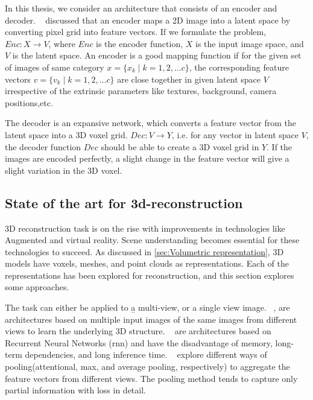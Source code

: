 In this thesis, we consider an architecture that consists of an encoder and decoder.
~\cite{Han2021ImageBased3O} discussed that an encoder maps a 2D image into a latent space by converting pixel grid into feature vectors.
If we formulate the problem, $Enc: X \to V$, where $Enc$ is the encoder function, $X$ is the input image space, and $V$ is the latent space.
An encoder is a good mapping function if for the given set of images of same category $x = \{x_k \mid k = 1,2,\dots c\}$, the corresponding feature vectors $v = \{v_k \mid k = 1,2,\dots c\}$ are close together in given latent space $V$
irrespective of the extrinsic parameters like textures, background, camera positions,etc.

The decoder is an expansive network, which converts a feature vector from the latent space into a 3D voxel grid.
$Dec: V \to Y$, i.e. for any vector in latent space $V$, the decoder function \textbf{$Dec$} should be able to create a 3D voxel grid in $Y$.
If the images are encoded perfectly, a slight change in the feature vector will give a slight variation in the 3D voxel.

\subsection{State of the art for 3d-reconstruction}\label{sec:state_of_the_art}

3D reconstruction task is on the rise with improvements in technologies like Augmented and virtual reality.
Scene understanding becomes essential for these technologies to succeed.
As discussed in \autoref{sec:Volumetric representation}, 3D models have voxels, meshes, and point clouds as representations.
Each of the representations has been explored for reconstruction, and this section explores some approaches.

The task can either be applied to \b{a multi-view, or a single view image}.
~\cite{Kar2017LearningAM, choy20163d, Yang_2019, huang2018deepmvs, Paschalidou2018RayNetLV, Xie_2019, Xie_2020},
are architectures based on multiple input images of the same images from different views to learn the underlying 3D structure.
~\cite{Kar2017LearningAM, choy20163d} are architectures based on Recurrent Neural Networks (\gls{rnn}) and have the disadvantage of memory,
long-term dependencies, and long inference time.
~\cite{Yang_2019, huang2018deepmvs, Paschalidou2018RayNetLV} explore different ways of pooling(attentional, max, and average pooling, respectively)
to aggregate the feature vectors from different views.
The pooling method tends to capture only partial information with loss in detail.

